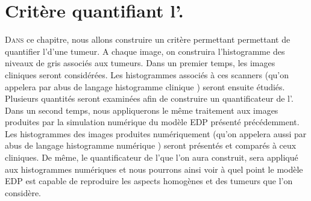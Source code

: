 \documentclass[main.tex]{subfiles}
\begin{document}



\chapter{Critère quantifiant l'\hetero. \label{chap:crit_hetero}}
\lettrine[lines=2, lhang=0.33, loversize=0.25]{D}{ans} ce chapitre, nous allons construire un critère permettant permettant de quantifier l'\hetero d'une tumeur.
A chaque image, on construira l'histogramme des niveaux de gris associés aux tumeurs. 
Dans un premier temps, les images cliniques seront considérées. Les histogrammes associés à ces scanners (qu'on appelera par abus de langage \og histogramme clinique \fg) seront ensuite étudiés. Plusieurs quantités seront examinées afin de construire un quantificateur de l'\hetero.
Dans un second temps, nous appliquerons le même traitement aux images produites par la simulation numérique du modèle EDP présenté précédemment. Les histogrammes des images produites numériquement (qu'on appelera aussi par abus de langage \og histogramme numérique \fg) seront présentés et comparés à ceux cliniques. De même, le quantificateur de l'\hetero que l'on aura construit, sera appliqué aux histogrammes numériques et nous pourrons ainsi voir à quel point le modèle EDP est capable de reproduire les aspects homogènes et \heterogenes des tumeurs que l'on considère.
\end{document}
